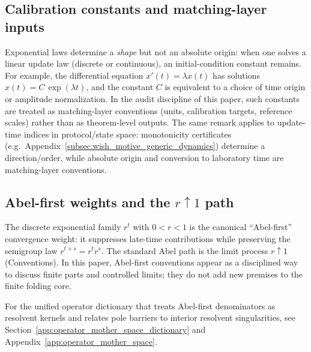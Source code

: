 \subsection{Calibration constants and matching-layer inputs}
\label{subsec:arrow_time_calibration_constants}

\InterfaceTag Exponential laws determine a \emph{shape} but not an absolute origin: when one solves a linear update law (discrete or continuous), an initial-condition constant remains.
For example, the differential equation $x'(t)=\lambda x(t)$ has solutions $x(t)=C\,\exp(\lambda t)$, and the constant $C$ is equivalent to a choice of time origin or amplitude normalization.
In the audit discipline of this paper, such constants are treated as matching-layer conventions (units, calibration targets, reference scales) rather than as theorem-level outputs.
\AuditTag The same remark applies to update-time indices in protocol/state space: monotonicity certificates (e.g.\ Appendix~\ref{subsec:wish_motive_generic_dynamics}) determine a direction/order, while absolute origin and conversion to laboratory time are matching-layer conventions.

\subsection{Abel-first weights and the \texorpdfstring{$r\uparrow 1$}{r->1} path}
\label{subsec:arrow_time_abel_first}

\MathTag The discrete exponential family $r^t$ with $0<r<1$ is the canonical ``Abel-first'' convergence weight: it suppresses late-time contributions while preserving the semigroup law $r^{t+s}=r^t r^s$.
The standard Abel path is the limit process $r\uparrow 1$ (Conventions).
In this paper, Abel-first conventions appear as a disciplined way to discuss finite parts and controlled limits; they do not add new premises to the finite folding core.

\AuditTag For the unified operator dictionary that treats Abel-first denominators as resolvent kernels and relates pole barriers to interior resolvent singularities, see Section~\ref{app:operator_mother_space_dictionary} and Appendix~\ref{app:operator_mother_space}.


